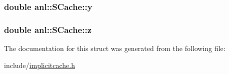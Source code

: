 \label{structanl_1_1SCache_aad2ff3143b7cd3eedae4d79c274f6860}
\hypertarget{structanl_1_1SCache_a1ad36832ec734bbe5aa9c88d8b26a54c}{
\subsubsection[{y}]{\setlength{\rightskip}{0pt plus 5cm}double {\bf anl::SCache::y}}}
\label{structanl_1_1SCache_a1ad36832ec734bbe5aa9c88d8b26a54c}
\hypertarget{structanl_1_1SCache_ac1b1997d6c218701d9922aa9b9d8d995}{
\subsubsection[{z}]{\setlength{\rightskip}{0pt plus 5cm}double {\bf anl::SCache::z}}}
\label{structanl_1_1SCache_ac1b1997d6c218701d9922aa9b9d8d995}


The documentation for this struct was generated from the following file:\begin{DoxyCompactItemize}
\item 
include/\hyperlink{implicitcache_8h}{implicitcache.h}\end{DoxyCompactItemize}
